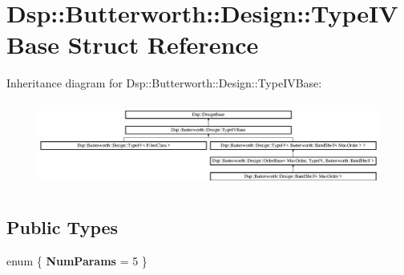 \hypertarget{structDsp_1_1Butterworth_1_1Design_1_1TypeIVBase}{\section{Dsp\-:\-:Butterworth\-:\-:Design\-:\-:Type\-I\-V\-Base Struct Reference}
\label{structDsp_1_1Butterworth_1_1Design_1_1TypeIVBase}
}
Inheritance diagram for Dsp\-:\-:Butterworth\-:\-:Design\-:\-:Type\-I\-V\-Base\-:\begin{figure}[H]
\begin{center}
\leavevmode
\includegraphics[height=2.839756cm]{structDsp_1_1Butterworth_1_1Design_1_1TypeIVBase}
\end{center}
\end{figure}
\subsection*{Public Types}
\begin{DoxyCompactItemize}
\item 
enum \{ {\bfseries Num\-Params} =  5
 \}
\end{DoxyCompactItemize}
